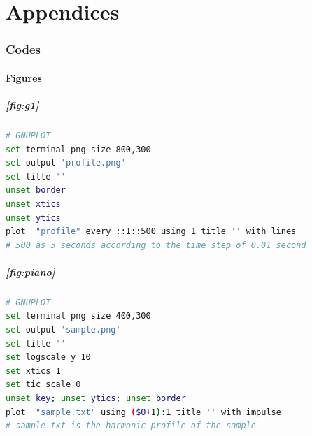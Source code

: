 \documentclass{book}
\begin{document}


\backmatter
\parttitlefont{\bfseries\rmfamily\Huge} 
\thispagestyle{empty}

\part*{Appendices}
 
 \appendix
\renewcommand\thefigure{\thesection.\arabic{figure}}    
\setcounter{figure}{0}    
\thispagestyle{empty}
\makeatletter
\setcounter{secnumdepth}{4}
\makeatother
\makeatletter
\renewcommand\thesection{}
\renewcommand\thesubsection{\@Alph\c@section.\@arabic\c@subsection}
\makeatother

\section{Codes}

\subsection{Figures}
\subsubsection{\ref{fig:g1}}
\label{an:pro}
\begin{lstlisting}[language=bash]
# GNUPLOT
set terminal png size 800,300 
set output 'profile.png' 
set title ''
unset border
unset xtics
unset ytics
plot  "profile" every ::1::500 using 1 title '' with lines 
# 500 as 5 seconds according to the time step of 0.01 second
\end{lstlisting}

\subsubsection{\ref{fig:piano}}
\label{an:pia}
\begin{lstlisting}[language=bash]
# GNUPLOT
set terminal png size 400,300 
set output 'sample.png' 
set title ''
set logscale y 10
set xtics 1
set tic scale 0
unset key; unset ytics; unset border 
plot  "sample.txt" using ($0+1):1 title '' with impulse
# sample.txt is the harmonic profile of the sample
\end{lstlisting}
\end{document}
